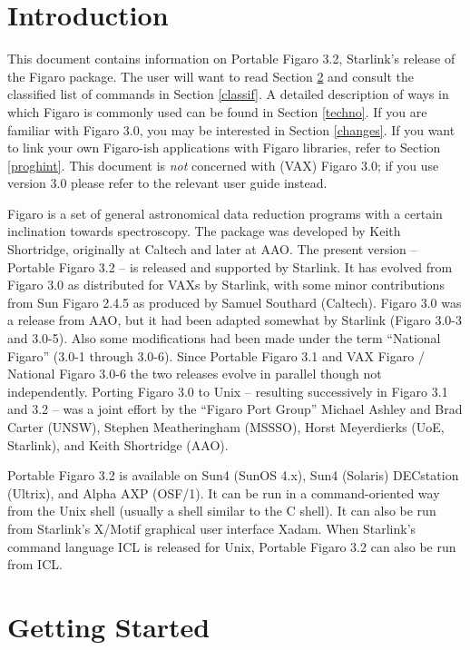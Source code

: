  \sloppy %

\section{Introduction}
\label{intro}

This document contains information on Portable Figaro 3.2, Starlink's
release of the Figaro package. The user will want to read Section
\ref{getstart} and consult the classified list of commands in Section
\ref{classif}. A detailed description of ways in which Figaro is
commonly used can be found in Section \ref{techno}.  If you are familiar
with Figaro 3.0, you may be interested in Section \ref{changes}. If you
want to link your own Figaro-ish applications with Figaro libraries,
refer to Section \ref{proghint}. This document is {\it not} concerned
with (VAX) Figaro 3.0; if you use version 3.0 please refer to the
relevant user guide instead.

Figaro is a set of general astronomical data reduction programs with a
certain inclination towards spectroscopy. The package was developed by
Keith Shortridge, originally at Caltech and later at AAO. The present
version -- Portable Figaro 3.2 -- is released and supported by Starlink.
It has evolved from Figaro 3.0 as distributed for VAXs by Starlink, with
some minor contributions from Sun Figaro 2.4.5 as produced by Samuel
Southard (Caltech).  Figaro 3.0 was a release from AAO, but it had been
adapted somewhat by Starlink (Figaro 3.0-3 and 3.0-5). Also some
modifications had been made under the term ``National Figaro'' (3.0-1
through 3.0-6).  Since Portable Figaro 3.1 and VAX Figaro / National
Figaro 3.0-6 the two releases evolve in parallel though not
independently.  Porting Figaro 3.0 to Unix -- resulting successively in
Figaro 3.1 and 3.2 -- was a joint effort by the ``Figaro Port Group''
Michael Ashley and Brad Carter (UNSW), Stephen Meatheringham (MSSSO),
Horst Meyerdierks (UoE, Starlink), and Keith Shortridge (AAO).

Portable Figaro 3.2 is available on Sun4 (SunOS 4.x), Sun4 (Solaris)
DECstation (Ultrix), and Alpha AXP (OSF/1).  It can be run in a
command-oriented way from the Unix shell (usually a shell similar to the
C shell).  It can also be run from Starlink's X/Motif graphical user
interface Xadam.  When Starlink's command language ICL is released for
Unix, Portable Figaro 3.2 can also be run from ICL.


\section{Getting Started}
\label{getstart}

